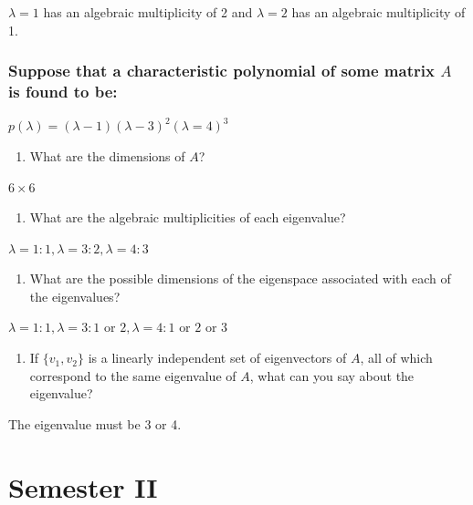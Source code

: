 \documentclass[
  letterpaper,
  DIV=11,
  numbers=noendperiod]{scrartcl}
\providecommand{\tightlist}{%
  \setlength{\itemsep}{0pt}\setlength{\parskip}{0pt}}\usepackage{longtable,booktabs,array}
\begin{document}
\(\lambda=1\) has an algebraic multiplicity of 2 and \(\lambda=2\) has
an algebraic multiplicity of 1.

\subsubsection{\texorpdfstring{Suppose that a characteristic polynomial
of some matrix \(A\) is found to
be:}{Suppose that a characteristic polynomial of some matrix A is found to be:}}\label{suppose-that-a-characteristic-polynomial-of-some-matrix-a-is-found-to-be}

\(p(\lambda) = (\lambda-1)(\lambda-3)^2(\lambda=4)^3\)

\begin{enumerate}
\def\labelenumi{\alph{enumi}.}
\tightlist
\item
  What are the dimensions of \(A\)?
\end{enumerate}

\(6\times6\)

\begin{enumerate}
\def\labelenumi{\alph{enumi}.}
\setcounter{enumi}{1}
\tightlist
\item
  What are the algebraic multiplicities of each eigenvalue?
\end{enumerate}

\(\lambda=1: 1, \lambda=3:2, \lambda=4:3\)

\begin{enumerate}
\def\labelenumi{\alph{enumi}.}
\setcounter{enumi}{2}
\tightlist
\item
  What are the possible dimensions of the eigenspace associated with
  each of the eigenvalues?
\end{enumerate}

\(\lambda=1:1, \lambda=3:1 \text{ or } 2, \lambda=4:1 \text{ or } 2 \text{ or } 3\)

\begin{enumerate}
\def\labelenumi{\alph{enumi}.}
\setcounter{enumi}{3}
\tightlist
\item
  If \(\{v_1, v_2\}\) is a linearly independent set of eigenvectors of
  \(A\), all of which correspond to the same eigenvalue of \(A\), what
  can you say about the eigenvalue?
\end{enumerate}

The eigenvalue must be 3 or 4.

\section{Semester II}\label{semester-ii}
\end{document}
